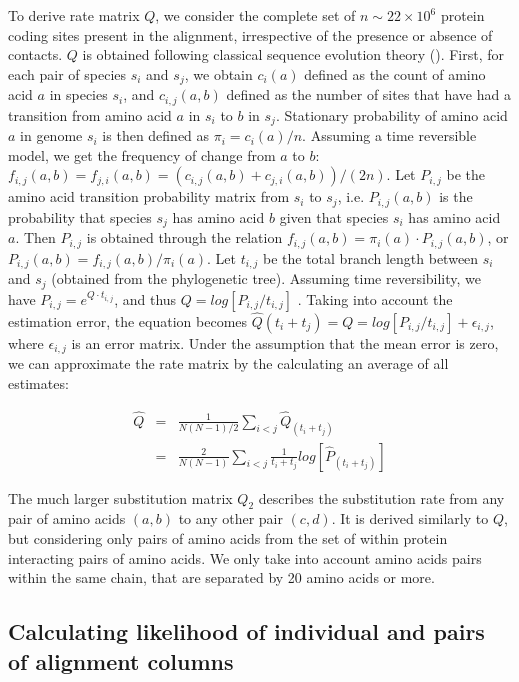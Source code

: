 To derive rate matrix $Q$, we consider the complete set of $n \sim 22 \times 10^6$ protein coding sites present in the alignment, irrespective of the presence or absence of contacts. $Q$ is obtained following classical sequence evolution theory (\cite{yang2006computational, felsenstein2004inferring}). First, for each pair of species  $s_i$ and $s_j$, we obtain $c_i(a)$ defined as the count of amino acid $a$ in species $s_i$, and $c_{i,j}(a,b)$ defined as the number of sites that have had a transition from amino acid $a$ in $s_i$ to $b$ in $s_j$. Stationary probability of amino acid $a$ in genome $s_i$ is then defined as $\pi_i = c_i(a)/n$. Assuming a time reversible model, we get the frequency of change from $a$ to $b$: $f_{i,j}(a,b) = f_{j,i}(a,b) = (c_{i,j}(a,b) + c_{j,i}(a,b))/(2n)$. Let $P_{i,j}$ be the amino acid transition probability matrix from $s_i$ to $s_j$, i.e. $P_{i,j}(a,b)$ is the probability that species $s_j$ has amino acid $b$ given that species $s_i$ has amino acid $a$. Then $P_{i,j}$ is obtained through the relation $f_{i,j}(a,b) = \pi_i(a) \cdot P_{i,j}(a,b)$, or $P_{i,j}(a,b) =   f_{i,j}(a,b) /  \pi_i(a)$.  Let $t_{i,j}$ be the total branch length between $s_i$ and $s_j$ (obtained from the phylogenetic tree). Assuming time reversibility, we have $P_{i,j} = e^{Q \cdot t_{i,j}}$, and thus $Q=log[ P_{i,j} / t_{i,j} ]$ \cite{yang2006computational}. Taking into account the estimation error, the equation becomes $\hat{Q}(t_i+t_j) = Q = log[ P_{i,j} / t_{i,j} ] + \epsilon_{i,j}$, where $\epsilon_{i,j}$ is an error matrix. Under the assumption that the mean error is zero, we can approximate the rate matrix by the calculating an average of all estimates:

\begin{eqnarray*}
	\hat{Q} & = & \frac{1}{N(N-1)/2} \sum_{i < j} \hat{Q}_(t_i+t_j) \\
	            & =  & \frac{2}{N(N-1)} \sum_{i<j} \frac{1}{t_i+t_j} log[ \hat{P}_(t_i+t_j) ]
\end{eqnarray*}

The much larger substitution matrix $Q_2$ describes the substitution rate from any pair of amino acids $(a,b)$ to any other pair $(c,d)$. It is derived similarly to $Q$, but considering only pairs of amino acids from the set of within protein interacting pairs of amino acids. We only take into account amino acids pairs within the same chain, that are separated by 20 amino acids or more. 

\subsection{Calculating likelihood of individual and pairs of alignment columns}

